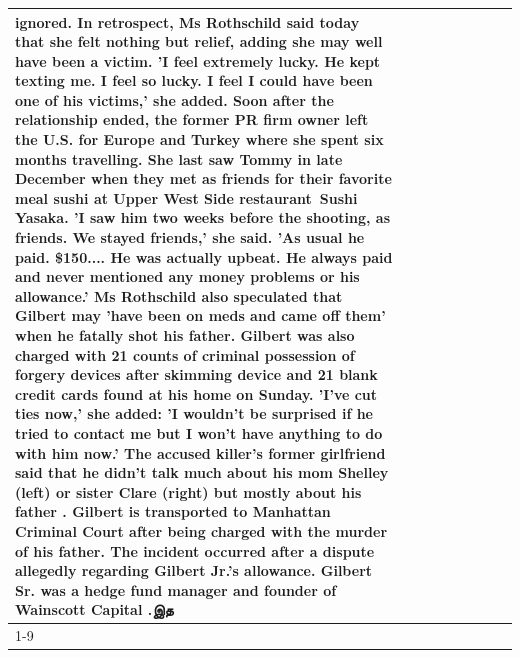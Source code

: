\begin{table}[H]
\begin{tabular}{lllrlllll}
ignored. In retrospect, Ms Rothschild said today that she felt nothing but relief, adding she may well have been a victim. 'I feel extremely lucky. He kept texting me. I feel so lucky. I feel I could have been one of his victims,' she added. Soon after the relationship ended, the former PR firm owner left the U.S. for Europe and Turkey where she spent six months  travelling. She last saw Tommy in late December when they met as friends for their favorite meal sushi at Upper West Side restaurant Sushi Yasaka. 'I saw him two weeks before the shooting, as friends. We stayed friends,' she said. 'As usual he paid. \$150.... He was actually upbeat. He always paid and never mentioned any money problems or his allowance.' Ms Rothschild also speculated that Gilbert may 'have been on meds and came off them' when he fatally shot his father. Gilbert was also charged with 21 counts of criminal possession of forgery devices after skimming device and 21 blank credit cards found at his home on Sunday. 'I've cut ties now,' she added: 'I wouldn’t be surprised if he tried to contact me but I won’t have anything to do with him now.' The accused killer's former girlfriend said that he didn't talk much about his mom Shelley (left) or sister Clare (right) but mostly about his father . Gilbert is transported to Manhattan Criminal Court  after being charged with the murder of his father. The incident occurred after a dispute allegedly regarding Gilbert Jr.'s allowance. Gilbert Sr. was a hedge fund manager and founder of Wainscott Capital .இத \\
\cline{1-9} \cline{2-9}

\end{tabular}
\end{table}
